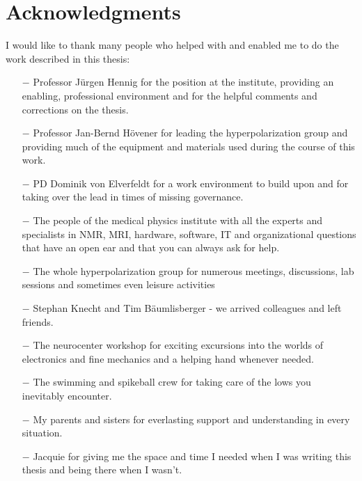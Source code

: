 \chapter{Acknowledgments}
\vspace{0.5cm}
I would like to thank many people who helped with and enabled me to do the work described in this thesis:
\begin{itemize}[leftmargin=1cm, rightmargin=1cm]
    \vspace{0.5cm}
\item[$-$]{Professor J\"urgen Hennig for the position at the institute, providing an enabling, professional environment and for the helpful comments and corrections on the thesis.}
\item[$-$]{Professor Jan-Bernd H\"ovener for leading the hyperpolarization group and providing much of the equipment and materials used during the course of this work.}
\item[$-$]{PD Dominik von Elverfeldt for a work environment to build upon and for taking over the lead in times of missing governance.}
\item[$-$]{The people of the medical physics institute with all the experts and specialists in NMR, MRI, hardware, software, IT and organizational questions that have an open ear and that you can always ask for help.}
\item[$-$]{The whole hyperpolarization group for numerous meetings, discussions, lab sessions and sometimes even leisure activities}
\item[$-$]{Stephan Knecht and Tim B\"aumlisberger - we arrived colleagues and left friends.}
\item[$-$]{The neurocenter workshop for exciting excursions into the worlds of electronics and fine mechanics and a helping hand whenever needed.}
\item[$-$]{The swimming and spikeball crew for taking care of the lows you inevitably encounter.}
\item[$-$]{My parents and sisters for everlasting support and understanding in every situation.}
\item[$-$]{Jacquie for giving me the space and time I needed when I was writing this thesis and being there when I wasn't.}
\end{itemize}
